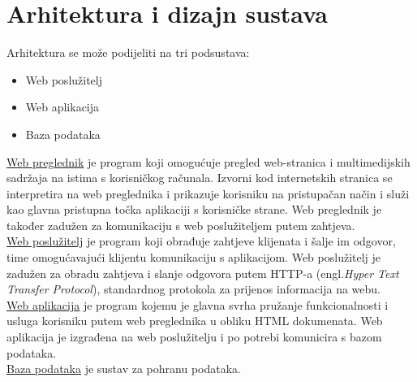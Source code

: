 \chapter{Arhitektura i dizajn sustava}
		


	Arhitektura se može podijeliti na tri podsustava:
	\begin{itemize}
		\item Web poslužitelj
		\item Web aplikacija
		\item Baza podataka
	\end{itemize}

	\underline{Web preglednik} je program koji omogućuje pregled web-stranica i multimedijskih sadržaja na istima s korisničkog računala. Izvorni kod internetskih stranica se interpretira na web preglednika i prikazuje korisniku na pristupačan način i služi kao glavna pristupna točka aplikaciji s korisničke strane. Web preglednik je također zadužen za komunikaciju s web poslužiteljem putem zahtjeva.\\
	\underline{Web poslužitelj} je program koji obrađuje zahtjeve klijenata i šalje im odgovor, time omogućavajući klijentu komunikaciju s aplikacijom. Web poslužitelj je zadužen za obradu zahtjeva i slanje odgovora putem HTTP-a (engl.\textit{Hyper Text Transfer Protocol}), standardnog protokola za prijenos informacija na webu.\\
	\underline{Web aplikacija} je program kojemu je glavna svrha pružanje funkcionalnosti i usluga korisniku putem web preglednika u obliku HTML dokumenata. Web aplikacija je izgrađena na web poslužitelju i po potrebi komunicira s bazom podataka.\\
	\underline{Baza podataka} je sustav za pohranu podataka.\\

